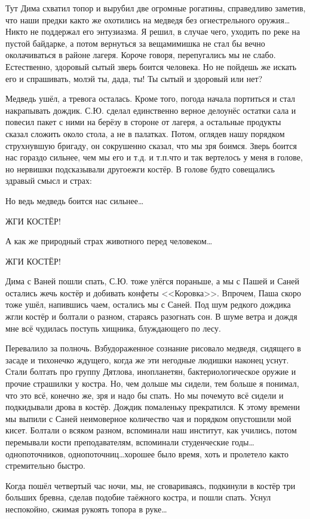 Тут Дима схватил топор и вырубил две огромные рогатины, справедливо заметив, что наши предки как\sdash то же охотились на медведя без огнестрельного оружия\ldots  Никто не поддержал его энтузиазма. Я решил, в случае чего, уходить по реке на пустой байдарке, а потом вернуться за вещами\mdash мишка не стал бы вечно околачиваться в районе лагеря. Короче говоря, перепугались мы не слабо. Естественно, здоровый сытый зверь боится человека. Но не пойдешь же искать его и спрашивать, мол\mdash эй ты, да\sdash да, ты! Ты сытый и здоровый или нет? 

Медведь ушёл, а тревога осталась. Кроме того, погода начала портиться и стал накрапывать дождик. С.Ю. сделал единственно верное дело\mdash унёс остатки сала и повесил пакет с ними на берёзу в стороне от лагеря, а остальные продукты сказал сложить около стола, а не в палатках. Потом, оглядев нашу порядком струхнувшую бригаду, он сокрушенно сказал, что мы зря боимся. Зверь боится нас гораздо сильнее, чем мы его и т.д. и т.п.\mdash что и так вертелось у меня в голове, но нервишки подсказывали другое\mdash жги костёр. В голове будто совещались здравый смысл и страх:

\ndash  Но ведь медведь боится нас сильнее\ldots  

\ndash  ЖГИ КОСТЁР! 

\ndash  А как же природный страх животного перед человеком\ldots  

\ndash  Ж\sdash Г\sdash И   К\sdash О\sdash С\sdash Т\sdash Ё\sdash Р!

Дима с Ваней пошли спать, С.Ю. тоже улёгся пораньше, а мы с Пашей и Саней остались жечь костёр и добивать конфеты <<Коровка>>. Впрочем, Паша скоро тоже ушёл, напившись чаем, остались мы с Саней. Под шум редкого дождика жгли костёр и болтали о разном, стараясь разогнать сон. В шуме ветра и дождя мне всё чудилась поступь хищника, блуждающего по лесу. 

Перевалило за полночь. Взбудораженное сознание рисовало медведя, сидящего в засаде и тихонечко ждущего, когда же эти негодные людишки наконец уснут. Стали болтать про группу Дятлова, инопланетян, бактериологическое оружие и прочие страшилки у костра. Но, чем дольше мы сидели, тем больше я понимал, что это всё, конечно же, зря и надо бы спать. Но мы почему\sdash то всё сидели и подкидывали дрова в костёр. Дождик помаленьку прекратился. К этому времени мы выпили с Саней неимоверное количество чая и порядком опустошили мой кисет. Болтали о всяком разном, вспоминали наш институт, как учились, потом перемывали кости преподавателям, вспоминали студенческие годы\ldots  однопоточников, однопоточниц\ldots  хорошее было время, хоть и пролетело как\sdash то стремительно быстро.

Когда пошёл четвертый час ночи, мы, не сговариваясь, подкинули в костёр три больших бревна, сделав подобие таёжного костра, и пошли спать. Уснул неспокойно, сжимая рукоять топора в руке\ldots 

\begin{center}
\end{center}
